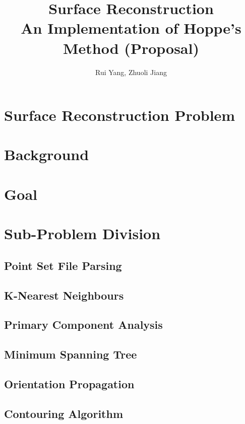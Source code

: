 \documentclass[12pt]{article}
\title{Surface Reconstruction\\An Implementation of Hoppe's Method (Proposal)}
\author{Rui Yang, Zhuoli Jiang}
\begin{document}
\maketitle
\section{Surface Reconstruction Problem}

\section{Background}
\section{Goal}
\section{Sub-Problem Division}
\subsection{Point Set File Parsing}
\subsection{K-Nearest Neighbours}
\subsection{Primary Component Analysis}
\subsection{Minimum Spanning Tree}
\subsection{Orientation Propagation}
\subsection{Contouring Algorithm}
\end{document}
